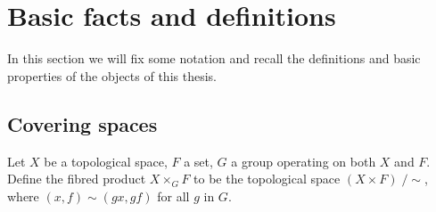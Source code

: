 \section{Basic facts and definitions}

In this section we will fix some notation and recall the definitions and basic properties of the objects of this thesis.

\iffalse
\subsection{Algebraic Curves}


\begin{defi}
 The \emph{$n$-dimensional affine space} is the set $\Abb^n$ of $n$-tuples with entries in $\Cbb$.
\end{defi}

\begin{defi}
 For an ideal $J\subset \Cbb[x_1,\ldots,x_n]$ we define the \emph{zero set $V(J)$ of $J$} as the set of points $p \in \Cbb$. For a subset 
$X\subset \Abb^n$ we define the \emph{ideal $I(V)$ of $X$} as usual.
\end{defi}
\fi

\subsection{Covering spaces} \label{sec:covering-spaces}

\begin{defi}
 Let $X$ be a topological space, $F$ a set, $G$ a group operating on both $X$ and $F$. Define the fibred product $X \times_{G} F$ to be the topological space $(X\times F)\; /\sim$, where $(x,f)\sim (gx,gf)$ for all $g$ in $G$.
\end{defi}

